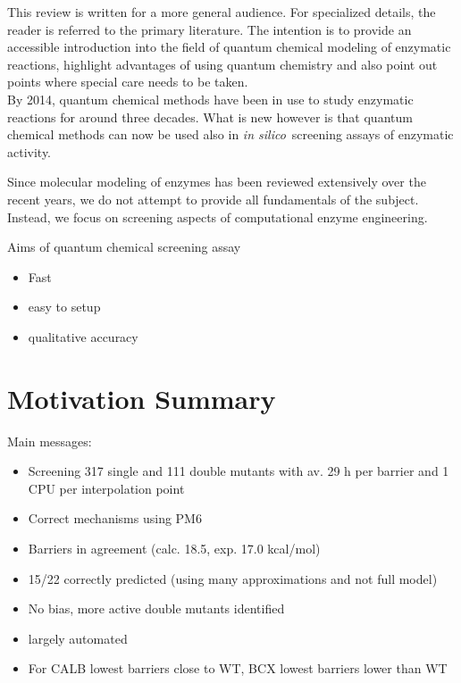This review is written for a more general audience.
For specialized details, the reader is referred to the primary literature.
The intention is to provide an accessible introduction into the field of quantum chemical modeling of enzymatic reactions, highlight advantages of using quantum chemistry and also point out points where special care needs to be taken.\\

By 2014, quantum chemical methods have been in use to study enzymatic reactions for around three decades.
What is new however is that quantum chemical methods can now be used also in \textit{in silico} screening assays of enzymatic activity.

Since molecular modeling of enzymes has been reviewed extensively over the recent years, we do not attempt to provide all fundamentals of the subject.
Instead, we focus on screening aspects of computational enzyme engineering.

Aims of quantum chemical screening assay
\begin{itemize}
\item Fast
\item easy to setup
\item qualitative accuracy
\end{itemize}


\section{Motivation Summary}\label{sec:mot_sum}
Main messages:
\begin{itemize}
\item Screening 317 single and 111 double mutants with av. 29 h per barrier and 1 CPU per interpolation point
\item Correct mechanisms using PM6
\item Barriers in agreement (calc. 18.5, exp. 17.0 kcal/mol)
\item 15/22 correctly predicted (using many approximations and not full model)
\item No bias, more active double mutants identified
\item largely automated
\item For CALB lowest barriers close to WT, BCX lowest barriers lower than WT
\end{itemize}



